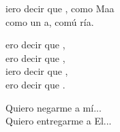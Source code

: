 \begin{cancion}%
	iero decir que , como Maa  \\
	como  un a, comú ría. \\
	\begin{chorus}%
	ero decir que ,  \\
	ero decir que , \\
	iero decir que , \\
	ero decir que . \\
	\end{chorus}%
Quiero negarme a mí...\\
	Quiero entregarme a El...\\
\end{cancion}%
